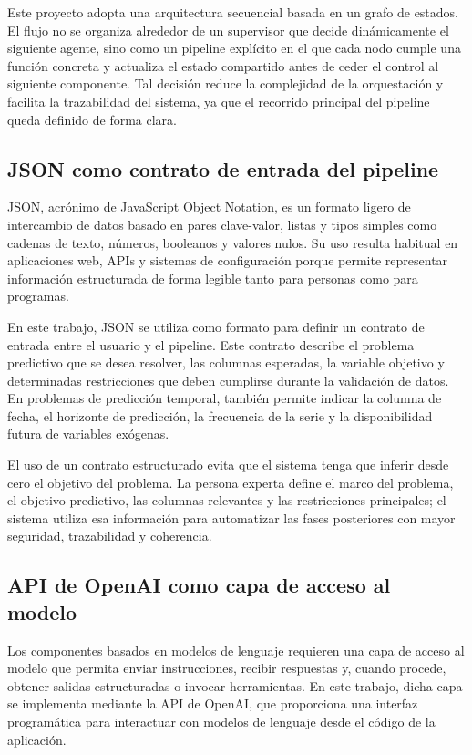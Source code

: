 \documentclass[12pt,a4paper]{article}
\theoremstyle{plain}
\begin{document}
Este proyecto adopta una arquitectura secuencial basada en un grafo de estados. El flujo no se organiza alrededor de un supervisor que decide dinámicamente el siguiente agente, sino como un pipeline explícito en el que cada nodo cumple una función concreta y actualiza el estado compartido antes de ceder el control al siguiente componente. Tal decisión reduce la complejidad de la orquestación y facilita la trazabilidad del sistema, ya que el recorrido principal del pipeline queda definido de forma clara.

\subsection{JSON como contrato de entrada del pipeline}
\label{sec:json-contrato}

JSON, acrónimo de JavaScript Object Notation, es un formato ligero de intercambio de datos basado en pares clave-valor, listas y tipos simples como cadenas de texto, números, booleanos y valores nulos. Su uso resulta habitual en aplicaciones web, APIs y sistemas de configuración porque permite representar información estructurada de forma legible tanto para personas como para programas.

En este trabajo, JSON se utiliza como formato para definir un contrato de entrada entre el usuario y el pipeline. Este contrato describe el problema predictivo que se desea resolver, las columnas esperadas, la variable objetivo y determinadas restricciones que deben cumplirse durante la validación de datos. En problemas de predicción temporal, también permite indicar la columna de fecha, el horizonte de predicción, la frecuencia de la serie y la disponibilidad futura de variables exógenas.

El uso de un contrato estructurado evita que el sistema tenga que inferir desde cero el objetivo del problema. La persona experta define el marco del problema, el objetivo predictivo, las columnas relevantes y las restricciones principales; el sistema utiliza esa información para automatizar las fases posteriores con mayor seguridad, trazabilidad y coherencia.


\subsection{API de OpenAI como capa de acceso al modelo}

Los componentes basados en modelos de lenguaje requieren una capa de acceso al modelo que permita enviar instrucciones, recibir respuestas y, cuando procede, obtener salidas estructuradas o invocar herramientas. En este trabajo, dicha capa se implementa mediante la API de OpenAI, que proporciona una interfaz programática para interactuar con modelos de lenguaje desde el código de la aplicación.
\end{document}
